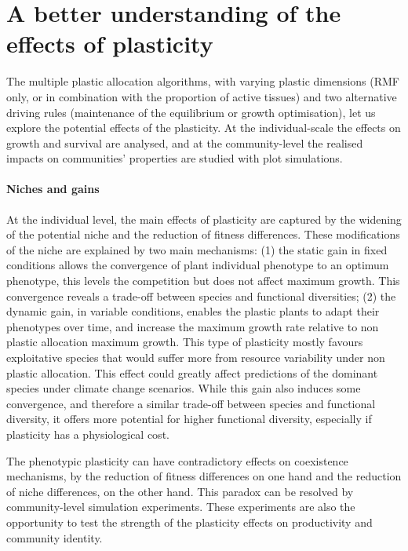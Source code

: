 \section{A better understanding of the effects of plasticity}

The multiple plastic allocation algorithms, with varying plastic dimensions (RMF only, or in combination with the proportion of active tissues) and two alternative driving rules (maintenance of the equilibrium or growth optimisation), let us explore the potential effects of the plasticity. At the individual-scale the effects on growth and survival are analysed, and at the community-level the realised impacts on communities' properties are studied with plot simulations.

\paragraph{Niches and gains}

At the individual level, the main effects of plasticity are captured by the widening of the potential niche and the reduction of fitness differences. These modifications of the niche are explained by two main mechanisms: (1) the static gain in fixed conditions allows the convergence of plant individual phenotype to an optimum phenotype, this levels the competition but does not affect maximum growth. This convergence reveals a trade-off between species and functional diversities; (2) the dynamic gain, in variable conditions, enables the plastic plants to adapt their phenotypes over time, and increase the maximum growth rate relative to non plastic allocation maximum growth. This type of plasticity mostly favours exploitative species that would suffer more from resource variability under non plastic allocation. This effect could greatly affect predictions of the dominant species under climate change scenarios. While this gain also induces some convergence, and therefore a similar trade-off between species and functional diversity, it offers more potential for higher functional diversity, especially if plasticity has a physiological cost.

The phenotypic plasticity can have contradictory effects on coexistence mechanisms, by the reduction of fitness differences on one hand and the reduction of niche differences, on the other hand. This paradox can be resolved by community-level simulation experiments. These experiments are also the opportunity to test the strength of the plasticity effects on productivity and community identity.

